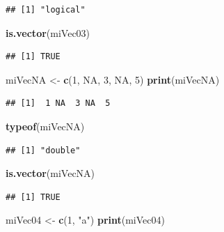 \documentclass[twoside,symmetric]{book}
\newenvironment{Shaded}{}{}
\newcommand{\DecValTok}[1]{#1}
\newcommand{\KeywordTok}[1]{\textbf{#1}}
\newcommand{\NormalTok}[1]{#1}
\newcommand{\OtherTok}[1]{#1}
\newcommand{\StringTok}[1]{#1}
\begin{document}
\begin{verbatim}
## [1] "logical"
\end{verbatim}

\begin{Shaded}
\begin{Highlighting}[]
\KeywordTok{is.vector}\NormalTok{(miVec03)}
\end{Highlighting}
\end{Shaded}

\begin{verbatim}
## [1] TRUE
\end{verbatim}

\begin{Shaded}
\begin{Highlighting}[]
\NormalTok{miVecNA <-}\StringTok{ }\KeywordTok{c}\NormalTok{(}\DecValTok{1}\NormalTok{, }\OtherTok{NA}\NormalTok{, }\DecValTok{3}\NormalTok{, }\OtherTok{NA}\NormalTok{, }\DecValTok{5}\NormalTok{)}
\KeywordTok{print}\NormalTok{(miVecNA)}
\end{Highlighting}
\end{Shaded}

\begin{verbatim}
## [1]  1 NA  3 NA  5
\end{verbatim}

\begin{Shaded}
\begin{Highlighting}[]
\KeywordTok{typeof}\NormalTok{(miVecNA)}
\end{Highlighting}
\end{Shaded}

\begin{verbatim}
## [1] "double"
\end{verbatim}

\begin{Shaded}
\begin{Highlighting}[]
\KeywordTok{is.vector}\NormalTok{(miVecNA)}
\end{Highlighting}
\end{Shaded}

\begin{verbatim}
## [1] TRUE
\end{verbatim}

\begin{Shaded}
\begin{Highlighting}[]
\NormalTok{miVec04 <-}\StringTok{ }\KeywordTok{c}\NormalTok{(}\DecValTok{1}\NormalTok{, }\StringTok{"a"}\NormalTok{)}
\KeywordTok{print}\NormalTok{(miVec04)}
\end{Highlighting}
\end{Shaded}
\end{document}
